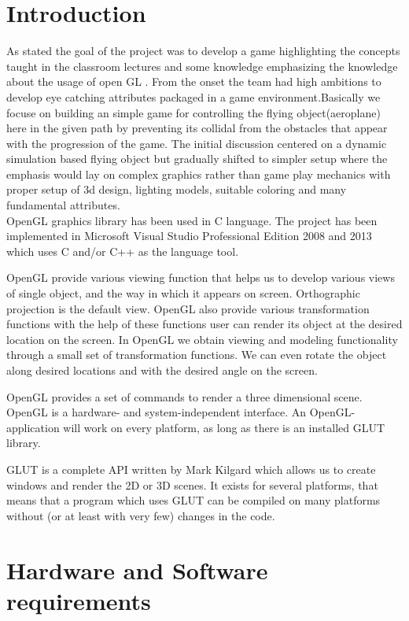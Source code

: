 \documentclass[12pt,a4]{article}
\begin{document}
\section{\Huge{Introduction}}
\large{
As stated the goal of the project was to develop a game highlighting the concepts taught in the
classroom lectures and some knowledge emphasizing the knowledge about the usage of open GL . From the onset the team had high ambitions to develop eye catching
attributes packaged in a game environment.Basically we focuse on building an simple game for controlling the flying object(aeroplane) here in the given path by preventing its collidal from the obstacles that appear with the progression of the game. The initial discussion centered on a dynamic simulation based flying object but gradually shifted to simpler setup where the emphasis would lay on complex graphics
rather than game play mechanics with proper setup of 3d design, lighting models, suitable coloring and many fundamental attributes.
\\
OpenGL graphics library has been used in C
language. The project has been implemented in Microsoft Visual Studio Professional Edition 2008
and 2013 which uses C and/or C++ as the language tool.

OpenGL provide various viewing function that helps us to develop various views of single
object, and the way in which it appears on screen. Orthographic projection is the default view.
OpenGL also provide various transformation functions with the help of these functions user can
render its object at the desired location on the screen. In OpenGL we obtain viewing and modeling
functionality through a small set of transformation functions. We can even rotate the object along
desired locations and with the desired angle on the screen.

OpenGL provides a set of commands to render a three dimensional scene. OpenGL is a
hardware- and system-independent interface. An OpenGL-application will work on every
platform, as long as there is an installed GLUT library.

GLUT is a complete API written by Mark Kilgard which allows us to create windows and
render the 2D or 3D scenes. It exists for several platforms, that means that a program which uses
GLUT can be compiled on many platforms without (or at least with very few) changes in the code.
}
\section{\Huge{Hardware and Software requirements}}
\end{document}
